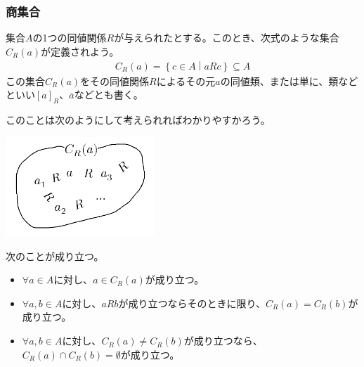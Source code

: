 \documentclass[dvipdfmx]{jsarticle}
\begin{document}
\subsubsection{商集合}%
\begin{dfn}
集合$A$の1つの同値関係$R$が与えられたとする。このとき、次式のような集合$C_{R}(a)$が定義されよう。
\begin{align*}
C_{R}(a) = \left\{ c \in A \middle| aRc \right\} \subseteq A
\end{align*}
この集合$C_{R}(a)$をその同値関係$R$によるその元$a$の同値類、または単に、類などといい$[ a]_{R}$、$\overline{a}$などとも書く。
\end{dfn}\par
このことは次のようにして考えられればわかりやすかろう。
\begin{center}
  \includegraphics[width=160pt]{1.2.5.b.png}
\end{center}
\begin{thm}\label{1.2.5.10}
次のことが成り立つ。
\begin{itemize}
\item
  $\forall a \in A$に対し、$a \in C_{R}(a)$が成り立つ。
\item
  $\forall a,b \in A$に対し、$aRb$が成り立つならそのときに限り、$C_{R}(a) = C_{R}(b)$が成り立つ。
\item
  $\forall a,b \in A$に対し、$C_{R}(a) \neq C_{R}(b)$が成り立つなら、$C_{R}(a) \cap C_{R}(b) = \emptyset$が成り立つ。
\end{itemize}
\end{thm}
\end{document}
